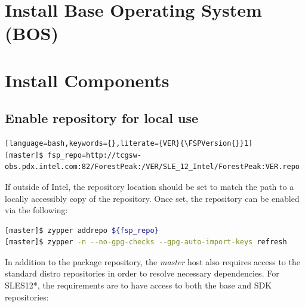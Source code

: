 \documentclass[letterpaper]{article}
\newcommand{\baseOS}{SLES12*}
\newcommand{\FSPVersion}{15.31}
\begin{document}






\section{Install Base Operating System (BOS)}



\section{Install \FSP{} Components} \label{sec:basic_install}


\subsection{Enable \FSP{} repository for local use} \label{sec:enable_repo}


\begin{lstlisting}[language=bash,keywords={},literate={VER}{\FSPVersion{}}1]
[master]$ fsp_repo=http://tcgsw-obs.pdx.intel.com:82/ForestPeak:/VER/SLE_12_Intel/ForestPeak:VER.repo
\end{lstlisting}


If outside of Intel, the repository location should be set to match the path to
a locally accessibly copy of the \FSP{} repository. Once set, the repository can be
enabled via the following:

\begin{lstlisting}[language=bash,keywords={}]
[master]$ zypper addrepo ${fsp_repo}
[master]$ zypper -n --no-gpg-checks --gpg-auto-import-keys refresh
\end{lstlisting}



In addition to the \FSP{} package repository, the {\em master} host also
requires access to the standard distro repositories in order to resolve
necessary dependencies. For \baseOS{}, the requirements are to have access to
both the base and SDK repositories:
\end{document}
